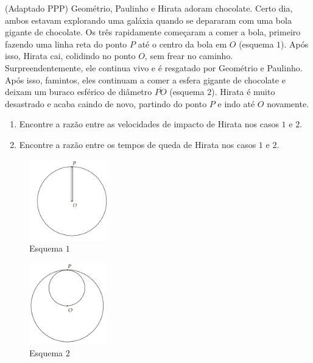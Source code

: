 \documentclass[11pt]{article}
\begin{document}
\begin{pproblem} (Adaptado PPP) Geométrio, Paulinho e Hirata adoram chocolate. Certo dia, ambos estavam explorando uma galáxia quando se depararam com uma bola gigante de chocolate. Os três rapidamente começaram a comer a bola, primeiro fazendo uma linha reta do ponto \(P\) até o centro da bola em \(O\) (esquema \(1\)). Após isso, Hirata cai, colidindo no ponto \(O\), sem frear no caminho. Surpreendentemente, ele continua vivo e é resgatado por Geométrio e Paulinho. Após isso, famintos, eles continuam a comer a esfera gigante de chocolate e deixam um buraco esférico de diâmetro \(\overline{PO}\) (esquema \(2\)). Hirata é muito desastrado e acaba caindo de novo, partindo do ponto \(P\) e indo até \(O\) novamente.
    \begin{enumerate}[label=\textbf{\alph*)}]
        \item Encontre a razão entre as velocidades de impacto de Hirata nos casos \(1\) e \(2\).
        \item Encontre a razão entre os tempos de queda de Hirata nos casos \(1\) e \(2\).
    \end{enumerate}
    \begin{paracol}{2}
        \begin{figure}[h]
            \centering
            \includegraphics[width=0.31\textwidth]{imagens/q5(1).png}
            \caption{Esquema \(1\)}
        \end{figure}
        \switchcolumn
        \begin{figure}[h]
            \centering
            \includegraphics[width=0.3\textwidth]{imagens/q5(2).png}
            \caption{Esquema \(2\)}
        \end{figure}
    \end{paracol} 


\end{pproblem}
\end{document}
